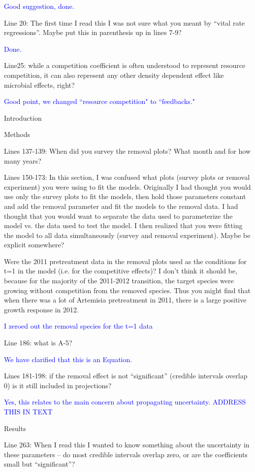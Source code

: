 \documentclass[12pt]{article}
\newcommand{\response}{\textcolor{blue}}
\begin{document}
\response{Good suggestion, done.}

Line 20: The first time I read this I was not sure what you meant by “vital rate regressions”. Maybe put this in parenthesis up in lines 7-9?

\response{Done.}

Line25: while a competition coefficient is often understood to represent resource competition, it can also represent any other density dependent effect like microbial effects, right?

\response{Good point, we changed ``resource competition" to ``feedbacks."}

Introduction

Methods

Lines 137-139:  When did you survey the removal plots? What month and for how many years? 

Lines 150-173: In this section, I was confused what plots (survey plots or removal experiment) you were using to fit the models. Originally I had thought you would use only the survey plots to fit the models, then hold those parameters constant and add the removal parameter and fit the models to the removal data. I had thought that you would want to separate the data used to parameterize the model vs. the data used to test the model. I then realized that you were fitting the model to all data simultaneously (survey and removal experiment). Maybe be explicit somewhere? 

Were the 2011 pretreatment data in the removal plots used as the conditions for t=1 in the model (i.e. for the competitive effects)? I don’t think it should be, because for the majority of the 2011-2012 transition, the target species were growing without competition from the removed species. Thus you might find that when there was a lot of Artemisia pretreatment in 2011, there is a large positive growth response in 2012.

\response{I zeroed out the removal species for the t=1 data}

Line 186: what is A-5?

\response{We have clarified that this is an Equation.}

Lines 181-198: if the removal effect is not “significant” (credible intervals overlap 0) is it still included in projections?

\response{Yes, this relates to the main concern about propagating uncertainty. ADDRESS THIS IN TEXT}


Results

Line 263:  When I read this I wanted to know something about the uncertainty in these parameters – do most credible intervals overlap zero, or are the coefficients small but “significant”?
\end{document}
